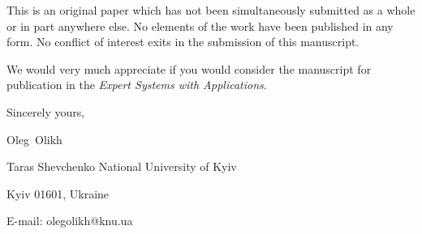 \documentclass[preprint]{elsarticle}
\begin{document}
This is an original paper which has not been simultaneously submitted as a whole or in part anywhere else.
No elements of the work have been published in any form.
No conflict of interest exits in the submission of this manuscript.


We would  very much appreciate if you would consider the manuscript for publication in the \emph{Expert Systems with Applications}.

%


\vspace{3mm}

Sincerely yours,

Oleg~Olikh 


Taras Shevchenko National University of Kyiv


Kyiv 01601, Ukraine

E-mail: olegolikh@knu.ua


\end{document}
